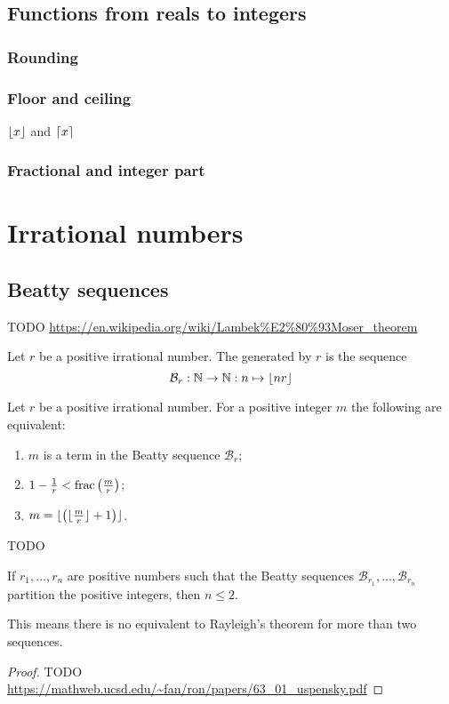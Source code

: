 \subsection{Functions from reals to integers}
\subsubsection{Rounding}
\subsubsection{Floor and ceiling}
$\lfloor x\rfloor$ and $\lceil x\rceil$
\subsubsection{Fractional and integer part}

\section{Irrational numbers}
\subsection{Beatty sequences}
TODO \url{https://en.wikipedia.org/wiki/Lambek%E2%80%93Moser_theorem}
\begin{definition}
Let $r$ be a positive irrational number. The  generated by $r$ is the sequence
\[ \mathcal{B}_r: \mathbb{N} \to \mathbb{N}: n\mapsto \lfloor nr\rfloor  \]
\end{definition}

\begin{lemma}
Let $r$ be a positive irrational number. For a positive integer $m$ the following are equivalent:
\begin{enumerate}
\item $m$ is a term in the Beatty sequence $\mathcal{B}_r$;
\item $1 - \frac{1}{r} < \operatorname{frac}\left(\frac{m}{r}\right)$;
\item $m = \lfloor\left(\lfloor\frac{m}{r}\rfloor+1\right)\rfloor$.
\end{enumerate}
\end{lemma}

\begin{theorem}[Rayleigh]
TODO
\end{theorem}

\begin{theorem}[Uspensky]
If $r_1, \ldots, r_n$ are positive numbers such that the Beatty sequences $\mathcal{B}_{r_1}, \ldots, \mathcal{B}_{r_n}$ partition the positive integers, then $n\leq 2$.
\end{theorem}
This means there is no equivalent to Rayleigh's theorem for more than two sequences.
\begin{proof}
TODO \url{https://mathweb.ucsd.edu/~fan/ron/papers/63_01_uspensky.pdf}
\end{proof}

